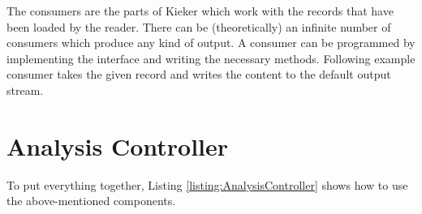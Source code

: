 		The consumers are the parts of Kieker which work with the records that have been loaded by the reader. There can be (theoretically) an infinite number of consumers which produce any kind of output. A consumer can be programmed by implementing the interface  and writing the necessary methods. Following example consumer takes the given record and writes the content to the default output stream.

		\setJavaCodeListing
		

	\section{Analysis Controller}\label{sec:analysis:controller}

		To put everything together, Listing \ref{listing:AnalysisController} shows how to use the above-mentioned components.

		\setJavaCodeListing
		
